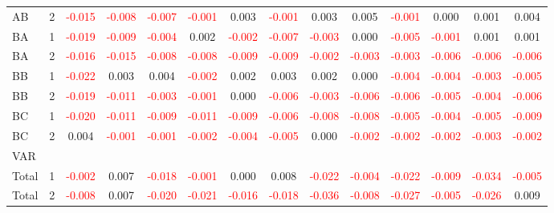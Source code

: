 \begin{table}[H]
{\begin{tabular}{llcccccccccccc}
AB & 2 & \textcolor{red}{-0.015} & \textcolor{red}{-0.008} & \textcolor{red}{-0.007} & \textcolor{red}{-0.001} & 0.003 & \textcolor{red}{-0.001} & 0.003 & 0.005 & \textcolor{red}{-0.001} & 0.000 & 0.001 & 0.004\\
BA & 1 & \textcolor{red}{-0.019} & \textcolor{red}{-0.009} & \textcolor{red}{-0.004} & 0.002 & \textcolor{red}{-0.002} & \textcolor{red}{-0.007} & \textcolor{red}{-0.003} & 0.000 & \textcolor{red}{-0.005} & \textcolor{red}{-0.001} & 0.001 & 0.001\\
BA & 2 & \textcolor{red}{-0.016} & \textcolor{red}{-0.015} & \textcolor{red}{-0.008} & \textcolor{red}{-0.008} & \textcolor{red}{-0.009} & \textcolor{red}{-0.009} & \textcolor{red}{-0.002} & \textcolor{red}{-0.003} & \textcolor{red}{-0.003} & \textcolor{red}{-0.006} & \textcolor{red}{-0.006} & \textcolor{red}{-0.006}\\
BB & 1 & \textcolor{red}{-0.022} & 0.003 & 0.004 & \textcolor{red}{-0.002} & 0.002 & 0.003 & 0.002 & 0.000 & \textcolor{red}{-0.004} & \textcolor{red}{-0.004} & \textcolor{red}{-0.003} & \textcolor{red}{-0.005}\\
BB & 2 & \textcolor{red}{-0.019} & \textcolor{red}{-0.011} & \textcolor{red}{-0.003} & \textcolor{red}{-0.001} & 0.000 & \textcolor{red}{-0.006} & \textcolor{red}{-0.003} & \textcolor{red}{-0.006} & \textcolor{red}{-0.006} & \textcolor{red}{-0.005} & \textcolor{red}{-0.004} & \textcolor{red}{-0.006}\\
BC & 1 & \textcolor{red}{-0.020} & \textcolor{red}{-0.011} & \textcolor{red}{-0.009} & \textcolor{red}{-0.011} & \textcolor{red}{-0.009} & \textcolor{red}{-0.006} & \textcolor{red}{-0.008} & \textcolor{red}{-0.008} & \textcolor{red}{-0.005} & \textcolor{red}{-0.004} & \textcolor{red}{-0.005} & \textcolor{red}{-0.009}\\
BC & 2 & 0.004 & \textcolor{red}{-0.001} & \textcolor{red}{-0.001} & \textcolor{red}{-0.002} & \textcolor{red}{-0.004} & \textcolor{red}{-0.005} & 0.000 & \textcolor{red}{-0.002} & \textcolor{red}{-0.002} & \textcolor{red}{-0.002} & \textcolor{red}{-0.003} & \textcolor{red}{-0.002}\\
\hline
VAR &  &  &  &  &  &  &  &  &  &  &  &  & \\
\hline
Total & 1 & \textcolor{red}{-0.002} & 0.007 & \textcolor{red}{-0.018} & \textcolor{red}{-0.001} & 0.000 & 0.008 & \textcolor{red}{-0.022} & \textcolor{red}{-0.004} & \textcolor{red}{-0.022} & \textcolor{red}{-0.009} & \textcolor{red}{-0.034} & \textcolor{red}{-0.005}\\
Total & 2 & \textcolor{red}{-0.008} & 0.007 & \textcolor{red}{-0.020} & \textcolor{red}{-0.021} & \textcolor{red}{-0.016} & \textcolor{red}{-0.018} & \textcolor{red}{-0.036} & \textcolor{red}{-0.008} & \textcolor{red}{-0.027} & \textcolor{red}{-0.005} & \textcolor{red}{-0.026} & 0.009\\

\end{tabular}}
\end{table}
